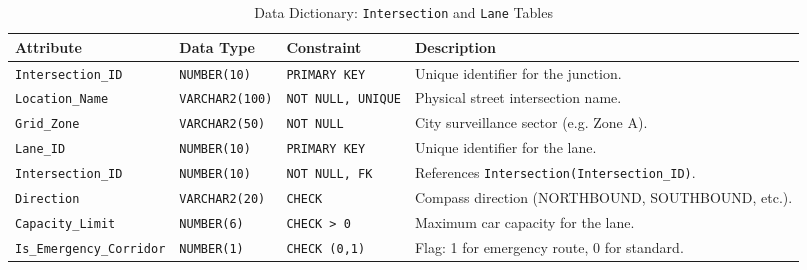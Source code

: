 \documentclass[11pt,a4paper]{article}
\begin{document}
\begin{table}[H]
\centering
\caption{Data Dictionary: \texttt{Intersection} and \texttt{Lane} Tables}
\label{tab:dict1}
\footnotesize
\begin{tabularx}{\textwidth}{lllX}
\toprule
\textbf{Attribute} & \textbf{Data Type} & \textbf{Constraint} & \textbf{Description} \\
\midrule
\texttt{Intersection\_ID} & \texttt{NUMBER(10)} & \texttt{PRIMARY KEY} & Unique identifier for the junction. \\
\texttt{Location\_Name}   & \texttt{VARCHAR2(100)} & \texttt{NOT NULL, UNIQUE} & Physical street intersection name. \\
\texttt{Grid\_Zone}       & \texttt{VARCHAR2(50)} & \texttt{NOT NULL} & City surveillance sector (e.g. Zone A). \\
\midrule
\texttt{Lane\_ID}         & \texttt{NUMBER(10)} & \texttt{PRIMARY KEY} & Unique identifier for the lane. \\
\texttt{Intersection\_ID} & \texttt{NUMBER(10)} & \texttt{NOT NULL, FK} & References \texttt{Intersection(Intersection\_ID)}. \\
\texttt{Direction}        & \texttt{VARCHAR2(20)} & \texttt{CHECK} & Compass direction (NORTHBOUND, SOUTHBOUND, etc.). \\
\texttt{Capacity\_Limit}  & \texttt{NUMBER(6)} & \texttt{CHECK > 0} & Maximum car capacity for the lane. \\
\texttt{Is\_Emergency\_Corridor} & \texttt{NUMBER(1)} & \texttt{CHECK (0,1)} & Flag: 1 for emergency route, 0 for standard. \\
\bottomrule
\end{tabularx}
\end{table}
\end{document}
